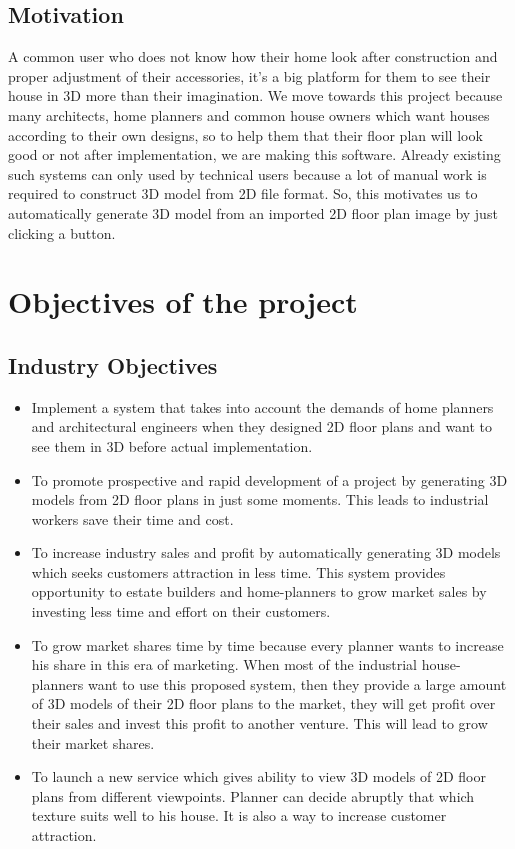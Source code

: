 \documentclass{article}
\begin{document}
\subsection{Motivation}
A common user who does not know how their home look after construction and proper adjustment of their accessories, it’s a big platform for them to see their house in 3D more than their imagination. We move towards this project because many architects, home planners and common house owners which want houses according to their own designs, so to help them that their floor plan will look good or not after implementation, we are making this software. Already existing such systems can only used by technical users because a lot of manual work is required to construct 3D model from 2D file format. So, this motivates us to automatically generate 3D model from an imported 2D floor plan image by just clicking a button.\cite{research}\\
\section{Objectives of the project}
\subsection{Industry Objectives}
\begin{itemize}
\item Implement a system that takes into account the demands of  home planners and architectural engineers when they designed 2D floor plans and want to see them in 3D before actual implementation.
\item To promote prospective and rapid development of a project by generating 3D models from 2D floor plans in just some moments. This leads to industrial workers save their time and cost.
\item To increase industry sales and profit by automatically generating 3D models which seeks customers attraction in less time. This system provides opportunity to estate builders and home-planners to grow market sales by investing less time and effort on their customers.
\item To grow market shares time by time because every planner wants to increase his share in this era of marketing. When most of the industrial house-planners want to use this proposed system, then they provide a large amount of 3D models of their 2D floor plans to the market, they will get profit over their sales and invest this profit to another venture. This will lead to grow their market shares.
\item To launch a new service which gives ability to view 3D models of 2D floor plans from different viewpoints. Planner can decide abruptly that which texture suits well to his house. It is also a way to increase customer attraction.
\end{itemize}
\end{document}
